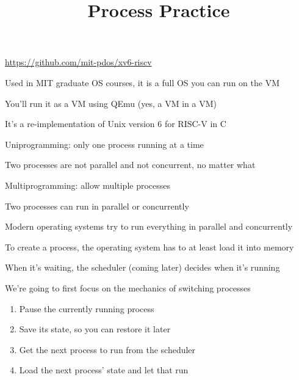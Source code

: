 

\title{Process Practice}


  \begin{frame}
    \titlepage
  \end{frame}

  \begin{slide}
    

    \url{https://github.com/mit-pdos/xv6-riscv}
    \medskip

    Used in MIT graduate OS courses, it is a full OS you can run on the VM

    \leftspace{}You'll run it as a VM using QEmu (yes, a VM in a VM)
    \bigskip
  
    It's a re-implementation of Unix version 6 for RISC-V in C
  \end{slide}

  \begin{slide}


    Uniprogramming: only one process running at a time

    \leftspace{}Two processes are not parallel and not concurrent, no matter
                 what
    \medskip

    Multiprogramming: allow multiple processes

    \leftspace{}Two processes can run in parallel or concurrently
    \bigskip

    Modern operating systems try to run everything in parallel and concurrently
  \end{slide}

  \begin{slide}

    To create a process, the operating system has to at least load it into memory
    \medskip

    When it's waiting, the scheduler (coming later) decides when it's running
    \medskip

    We're going to first focus on the mechanics of switching processes
  \end{slide}

  \begin{slide}

    \begin{enumerate}
      \item Pause the currently running process 
      \item Save its state, so you can restore it later
      \item Get the next process to run from the scheduler
      \item Load the next process' state and let that run
    \end{enumerate}
  \end{slide}

